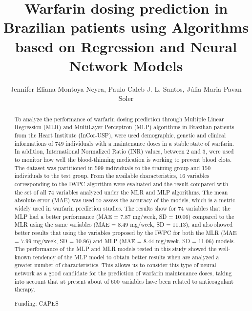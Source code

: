 \documentclass[twoside]{article}
\title{\vspace{-15mm}\fontsize{24pt}{10pt}\selectfont\textbf{ Warfarin dosing prediction in Brazilian patients using Algorithms based on Regression and Neural Network Models }} %
\author{ Jennifer Eliana Montoya Neyra, Paulo Caleb J. L. Santos, J\'ulia Maria Pavan Soler }
\affil{ Laboratory of Genetics and Molecular Cardiology,  Faculdade de Medicina FMUSP,  Heart Institute (InCor),  University of S\~ao Paulo. }
\date{}
\begin{document}
  
  
  \maketitle %
  
  
  \thispagestyle{fancy} %
  
  
  \begin{abstract}
  To analyze the performance of warfarin dosing prediction through Multiple Linear Regression (MLR) and MultiLayer Perceptron (MLP) algorithms in Brazilian patients from the Heart Institute (InCor-USP),  were used demographic,  genetic and clinical informations of 749 individuals with a maintenance doses in a stable state of warfarin. In addition,  International Normalized Ratio (INR) values,  between 2 and 3,  were used to monitor how well the blood-thinning medication is working to prevent blood clots. The dataset was partitioned in 599 individuals to the training group and 150 individuals to the test group. From the available characteristics,  16 variables corresponding to the IWPC algorithm were evaluated and the result compared with the set of all 74 variables analyzed under the MLR and MLP algorithms. The mean absolute error (MAE) was used to assess the accuracy of the models,  which is a metric widely used in warfarin prediction studies. The results show for 74 variables that the MLP had a better performance (MAE = 7.87 mg/week,  SD = 10.06) compared to the MLR using the same variables (MAE = 8.49 mg/week,  SD = 11.13),  and also showed better results that using the variables proposed by the IWPC for both the MLR (MAE = 7.99 mg/week,  SD = 10.86) and MLP (MAE = 8.44 mg/week,  SD = 11.06) models. The performance of the MLP and MLR models tested in this study showed the well-known tendency of the MLP model to obtain better results when are analyzed a greater number of characteristics. This allows us to consider this type of neural network as a good candidate for the prediction of warfarin maintenance doses,  taking into account that at present about of 600 variables have been related to anticoagulant therapy.
  
  Funding: CAPES \\ 
  \end{abstract}
  
\end{document}
